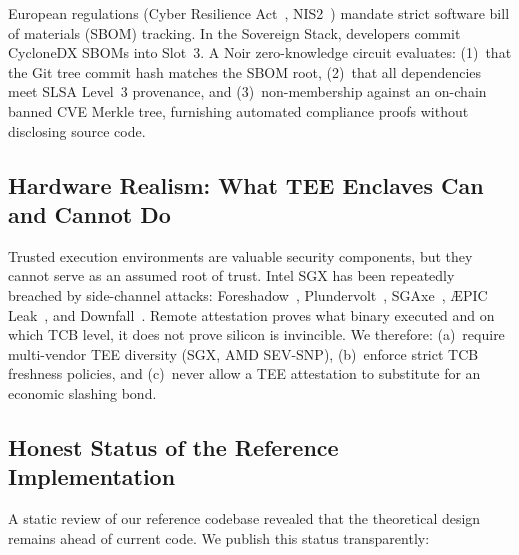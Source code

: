 \documentclass[a4paper,11pt,twoside,parskip=half-,headings=small]{scrartcl}
\begin{document}
European regulations (Cyber Resilience Act~\cite{cra}, NIS2~\cite{nis2}) mandate strict
software bill of materials (SBOM) tracking. In the Sovereign Stack, developers commit
CycloneDX SBOMs into Slot~3. A Noir zero-knowledge circuit evaluates:
(1)~that the Git tree commit hash matches the SBOM root,
(2)~that all dependencies meet SLSA Level~3 provenance, and
(3)~non-membership against an on-chain banned CVE Merkle tree, furnishing automated
compliance proofs without disclosing source code.

\subsection{Hardware Realism: What TEE Enclaves Can and Cannot Do}

Trusted execution environments are valuable security components, but they cannot serve
as an assumed root of trust. Intel SGX has been repeatedly breached by side-channel
attacks: Foreshadow~\cite{vanbulck2018foreshadow}, Plundervolt~\cite{murdock2020plundervolt},
SGAxe~\cite{vanschaik2020sgaxe}, \AE{}PIC Leak~\cite{borrello2022aepic}, and
Downfall~\cite{moghimi2023downfall}. Remote attestation proves what binary executed
and on which TCB level, it does not prove silicon is invincible. We therefore:
(a)~require multi-vendor TEE diversity (SGX, AMD SEV-SNP),
(b)~enforce strict TCB freshness policies, and
(c)~never allow a TEE attestation to substitute for an economic slashing bond.

\subsection{Honest Status of the Reference Implementation}

A static review of our reference codebase revealed that the theoretical design remains
ahead of current code. We publish this status transparently:
\end{document}
